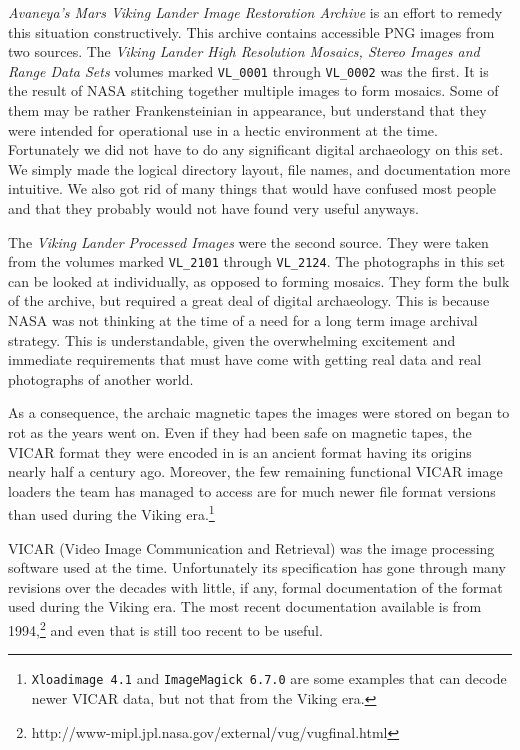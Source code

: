 {\it Avaneya's Mars Viking Lander Image Restoration Archive} is an effort to remedy this situation constructively. This archive contains accessible PNG images from two sources. The {\it Viking Lander High Resolution Mosaics, Stereo Images and Range Data Sets} volumes marked {\tt VL_0001} through {\tt VL_0002} was the first. It is the result of NASA stitching together multiple images to form mosaics. Some of them may be rather Frankensteinian in appearance, but understand that they were intended for operational use in a hectic environment at the time. Fortunately we did not have to do any significant digital archaeology on this set. We simply made the logical directory layout, file names, and documentation more intuitive. We also got rid of many things that would have confused most people and that they probably would not have found very useful anyways.

The {\it Viking Lander Processed Images} were the second source. They were taken from the volumes marked {\tt VL_2101} through {\tt VL_2124}. The photographs in this set can be looked at individually, as opposed to forming mosaics. They form the bulk of the archive, but required a great deal of digital archaeology. This is because NASA was not thinking at the time of a need for a long term image archival strategy. This is understandable, given the overwhelming excitement and immediate requirements that must have come with getting real data and real photographs of another world.

    {}

As a consequence, the archaic magnetic tapes the images were stored on began to rot as the years went on. Even if they had been safe on magnetic tapes, the VICAR format they were encoded in is an ancient format having its origins nearly half a century ago. Moreover, the few remaining functional VICAR image loaders the team has managed to access are for much newer file format versions than used during the Viking era.\footnote{{\tt Xloadimage 4.1} and {\tt ImageMagick 6.7.0} are some examples that can decode newer VICAR data, but not that from the Viking era.}

VICAR (Video Image Communication and Retrieval) was the image processing software used at the time. Unfortunately its specification has gone through many revisions over the decades with little, if any, formal documentation of the format used during the Viking era. The most recent documentation available is from 1994,\footnote{http://www-mipl.jpl.nasa.gov/external/vug/vugfinal.html} and even that is still too recent to be useful.

